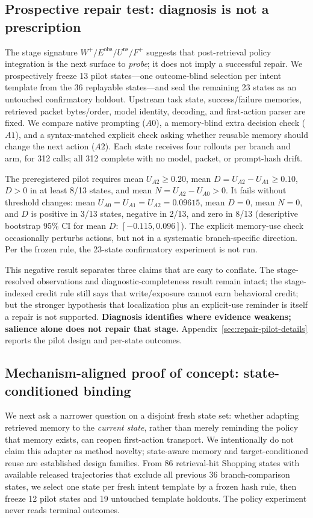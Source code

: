 \subsection{Prospective repair test: diagnosis is not a prescription}
\label{sec:repair-pilot}
The stage signature $W^+/E^{\mathrm{obs}}/U^{\mathrm{ns}}/F^+$ suggests that post-retrieval policy integration is the next surface to \emph{probe}; it does not imply a successful repair. We prospectively freeze 13 pilot states---one outcome-blind selection per intent template from the 36 replayable states---and seal the remaining 23 states as an untouched confirmatory holdout. Upstream task state, success/failure memories, retrieved packet bytes/order, model identity, decoding, and first-action parser are fixed. We compare native prompting ($A0$), a memory-blind extra decision check ($A1$), and a syntax-matched explicit check asking whether reusable memory should change the next action ($A2$). Each state receives four rollouts per branch and arm, for 312 calls; all 312 complete with no model, packet, or prompt-hash drift.

The preregistered pilot requires mean $U_{A2}\ge0.20$, mean $D=U_{A2}-U_{A1}\ge0.10$, $D>0$ in at least 8/13 states, and mean $N=U_{A2}-U_{A0}>0$. It fails without threshold changes: mean $U_{A0}=U_{A1}=U_{A2}=0.09615$, mean $D=0$, mean $N=0$, and $D$ is positive in 3/13 states, negative in 2/13, and zero in 8/13 (descriptive bootstrap 95\% CI for mean $D$: $[-0.115,0.096]$). The explicit memory-use check occasionally perturbs actions, but not in a systematic branch-specific direction. Per the frozen rule, the 23-state confirmatory experiment is not run.

This negative result separates three claims that are easy to conflate. The stage-resolved observations and diagnostic-completeness result remain intact; the stage-indexed credit rule still says that write/exposure cannot earn behavioral credit; but the stronger hypothesis that localization plus an explicit-use reminder is itself a repair is not supported. \textbf{Diagnosis identifies where evidence weakens; salience alone does not repair that stage.} Appendix~\ref{sec:repair-pilot-details} reports the pilot design and per-state outcomes.

\subsection{Mechanism-aligned proof of concept: state-conditioned binding}
We next ask a narrower question on a disjoint fresh state set: whether adapting retrieved memory to the \emph{current state}, rather than merely reminding the policy that memory exists, can reopen first-action transport. We intentionally do not claim this adapter as method novelty; state-aware memory and target-conditioned reuse are established design families. From 86 retrieval-hit Shopping states with available released trajectories that exclude all previous 36 branch-comparison states, we select one state per fresh intent template by a frozen hash rule, then freeze 12 pilot states and 19 untouched template holdouts. The policy experiment never reads terminal outcomes.

